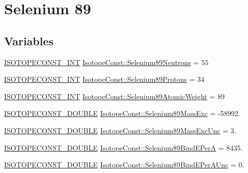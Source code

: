 \hypertarget{group___isotope_const-_selenium-_se89}{}\section{Selenium 89}
\label{group___isotope_const-_selenium-_se89}
\subsection*{Variables}
\begin{DoxyCompactItemize}
\item 
\mbox{\hyperlink{group___isotope_const-_macros_ga5f18360b3e99483a35c32d789e62621c}{I\+S\+O\+T\+O\+P\+E\+C\+O\+N\+S\+T\+\_\+\+I\+NT}} \mbox{\hyperlink{group___isotope_const-_selenium-_se89_ga22b5469dd0fd31af8bc3a56d8a94db40}{Isotope\+Const\+::\+Selenium89\+Neutrons}} = 55
\item 
\mbox{\hyperlink{group___isotope_const-_macros_ga5f18360b3e99483a35c32d789e62621c}{I\+S\+O\+T\+O\+P\+E\+C\+O\+N\+S\+T\+\_\+\+I\+NT}} \mbox{\hyperlink{group___isotope_const-_selenium-_se89_ga499c0f487219260ec19f0876f8e56f7b}{Isotope\+Const\+::\+Selenium89\+Protons}} = 34
\item 
\mbox{\hyperlink{group___isotope_const-_macros_ga5f18360b3e99483a35c32d789e62621c}{I\+S\+O\+T\+O\+P\+E\+C\+O\+N\+S\+T\+\_\+\+I\+NT}} \mbox{\hyperlink{group___isotope_const-_selenium-_se89_ga8724654abe1d83f8700c4d31b4a57be4}{Isotope\+Const\+::\+Selenium89\+Atomic\+Weight}} = 89
\item 
\mbox{\hyperlink{group___isotope_const-_macros_ga8f45a7272ce02c0b4c65c44636ed719a}{I\+S\+O\+T\+O\+P\+E\+C\+O\+N\+S\+T\+\_\+\+D\+O\+U\+B\+LE}} \mbox{\hyperlink{group___isotope_const-_selenium-_se89_gab34968ab9e4de53cbaccda75d1064a23}{Isotope\+Const\+::\+Selenium89\+Mass\+Exc}} = -\/58992.
\item 
\mbox{\hyperlink{group___isotope_const-_macros_ga8f45a7272ce02c0b4c65c44636ed719a}{I\+S\+O\+T\+O\+P\+E\+C\+O\+N\+S\+T\+\_\+\+D\+O\+U\+B\+LE}} \mbox{\hyperlink{group___isotope_const-_selenium-_se89_gaacfed4be22d9175470166822519fde07}{Isotope\+Const\+::\+Selenium89\+Mass\+Exc\+Unc}} = 3.
\item 
\mbox{\hyperlink{group___isotope_const-_macros_ga8f45a7272ce02c0b4c65c44636ed719a}{I\+S\+O\+T\+O\+P\+E\+C\+O\+N\+S\+T\+\_\+\+D\+O\+U\+B\+LE}} \mbox{\hyperlink{group___isotope_const-_selenium-_se89_gacece702eef8cd6bc0ad04158132d684f}{Isotope\+Const\+::\+Selenium89\+Bind\+E\+PerA}} = 8435.
\item 
\mbox{\hyperlink{group___isotope_const-_macros_ga8f45a7272ce02c0b4c65c44636ed719a}{I\+S\+O\+T\+O\+P\+E\+C\+O\+N\+S\+T\+\_\+\+D\+O\+U\+B\+LE}} \mbox{\hyperlink{group___isotope_const-_selenium-_se89_ga489e89ca088332f2793ba96b3a8fa16f}{Isotope\+Const\+::\+Selenium89\+Bind\+E\+Per\+A\+Unc}} = 0.

\end{DoxyCompactItemize}
